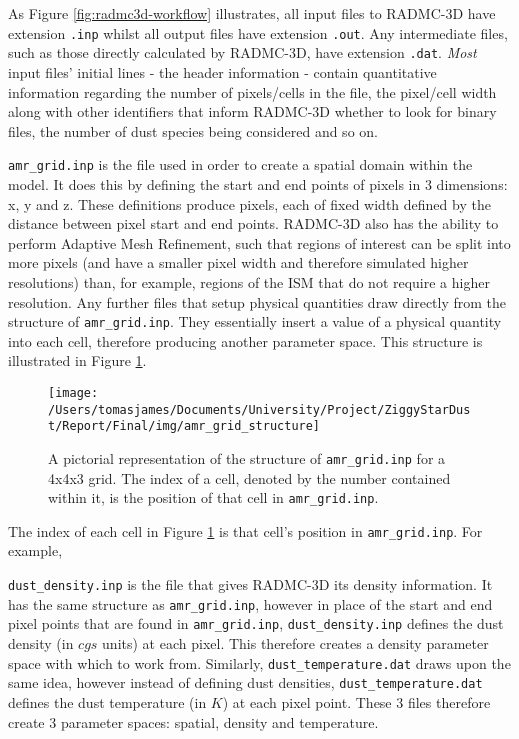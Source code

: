 \documentclass{report}
\begin{document}
As Figure \ref{fig:radmc3d-workflow} illustrates, all input files to RADMC-3D have extension \texttt{.inp} whilst all output files have extension \texttt{.out}. Any intermediate files, such as those directly calculated by RADMC-3D, have extension \texttt{.dat}. \textit{Most} input files' initial lines - the header information - contain quantitative information regarding the number of pixels/cells in the file, the pixel/cell width along with other identifiers that inform RADMC-3D whether to look for binary files, the number of dust species being considered and so on.

\texttt{amr\_grid.inp} is the file used in order to create a spatial domain within the model. It does this by defining the start and end points of pixels in 3 dimensions: x, y and z. These definitions produce pixels, each of fixed width defined by the distance between pixel start and end points. RADMC-3D also has the ability to perform Adaptive Mesh Refinement, such that regions of interest can be split into more pixels (and have a smaller pixel width and therefore simulated higher resolutions) than, for example, regions of the ISM that do not require a higher resolution. Any further files that setup physical quantities draw directly from the structure of \texttt{amr\_grid.inp}. They essentially \textquotesingle insert \textquotesingle a value of a physical quantity into each cell, therefore producing another parameter space. This structure is illustrated in Figure \ref{fig:amr_grid_structure}.

\begin{figure}[h]
  \centering
  \texttt{[image: /Users/tomasjames/Documents/University/Project/ZiggyStarDust/Report/Final/img/amr\_grid\_structure]}
  \caption[A pictorial representation of the structure of \texttt{amr_grid.inp} for a 4x4x3 grid. The index of a cell, denoted by the number contained within it, is the position of that cell in \texttt{amr_grid.inp}.]{A pictorial representation of the structure of \texttt{amr_grid.inp} for a 4x4x3 grid. The index of a cell, denoted by the number contained within it, is the position of that cell in \texttt{amr_grid.inp}.}
  \label{fig:amr_grid_structure}
\end{figure}

The index of each cell in Figure \ref{fig:amr_grid_structure} is that cell's position in \texttt{amr\_grid.inp}. For example, 

\texttt{dust\_density.inp} is the file that gives RADMC-3D its density information. It has the same structure as \texttt{amr\_grid.inp}, however in place of the start and end pixel points that are found in \texttt{amr\_grid.inp}, \texttt{dust\_density.inp} defines the dust density (in $cgs$ units) at each pixel. This therefore creates a density parameter space with which to work from. Similarly, \texttt{dust\_temperature.dat} draws upon the same idea, however instead of defining dust densities, \texttt{dust\_temperature.dat} defines the dust temperature (in $K$) at each pixel point. These 3 files therefore create 3 parameter spaces: spatial, density and temperature.
\end{document}
